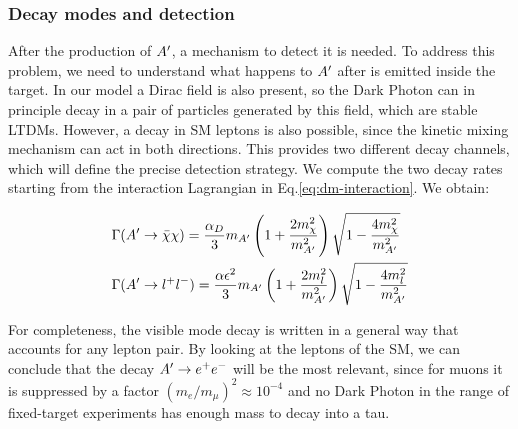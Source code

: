 \subsubsection{Decay modes and detection}
\label{ch1:sec:dm-decay}

After the production of $A'$, a mechanism to detect it is needed. To address this problem, we need to understand what happens to $A'$ after is emitted inside the target. In our model a Dirac field is also present, so the Dark Photon can in principle decay in a pair of particles generated by this field, which are stable LTDMs. However, a decay in SM leptons is also possible, since the kinetic mixing mechanism can act in both directions. This provides two different decay channels, which will define the precise detection strategy. We compute the two decay rates starting from the interaction Lagrangian in Eq.\ref{eq:dm-interaction}. We obtain:

\begin{equation}
  \label{eq:dm-bratio}
  \begin{aligned}
    &\Gamma(A' \to \bar{\chi} \chi) = \frac{\alpha_D}{3} m_{A'} \left( 1 + \frac{2m^2_{\chi}}{m_{A'}^2}\right) \sqrt{1 - \frac{4m_{\chi}^2}{m^2_{A'}}}\\
    &\Gamma(A' \to l^+l^-) = \frac{\alpha \epsilon^2}{3} m_{A'} \left( 1 + \frac{2m^2_{l}}{m_{A'}^2}\right) \sqrt{1 - \frac{4m_{l}^2}{m^2_{A'}}}
  \end{aligned}
\end{equation}

For completeness, the visible mode decay is written in a general way that accounts for any lepton pair. By looking at the leptons of the SM, we can conclude that the decay $A' \to e^+e^-$ will be the most relevant, since for muons it is suppressed by a factor $(m_e/m_{\mu})^2 \approx 10^{-4}$ and no Dark Photon in the range of fixed-target experiments has enough mass to decay into a tau.

